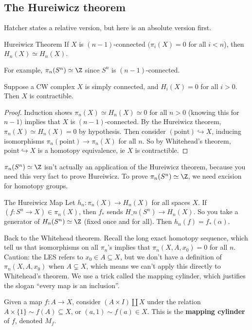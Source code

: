 \subsection{The Hureiwicz theorem}
Hatcher states a relative version, but here is an absolute version first.
\begin{namedthm}{Hureiwicz Theorem}
    If $X$ is $(n-1)$-connected $(\pi_i  (X)=0$ for all $i<n$), then $H_n (X) \simeq H_n (X)$. 
\end{namedthm}
For example, $\pi_n (S^n )\simeq\Z$ since $S^n $ is $(n-1)$-connected.
\begin{cor}
    Suppose a CW complex $X$ is simply connected, and $H_i (X)=0$ for all $i>0$. Then $X$ is contractible.
\end{cor}
\begin{proof}
    Induction shows $\pi_n (X)\simeq H_n (X) \simeq 0$ for all $n>0$ (knowing this for $n-1)$ implies that $X$ is $(n-1)$-connected. By the Hureiwicz theorem, $\pi_n (X)\simeq H_n (X)=0$ by hypothesis. Then consider $(\text{point}  )\hookrightarrow X$, inducing isomorphisms $\pi_n (\text{point} )\to \pi_n (X) $ for all $n$. So by Whitehead's theorem, $\text{point} \hookrightarrow X$ is a homotopy equivalence, ie $X$ is contractible.
\end{proof}
\begin{note}
    $\pi_n (S^n )\simeq\Z$ isn't actually an application of the Hureiwicz theorem, because you need this very fact to prove Hureiwicz. To prove  $\pi_n (S^n )\simeq\Z$, we need excision for homotopy groups.
\end{note}
\begin{namedthing}{The Hureiwicz Map}
    Let $h_n  \colon \pi_n (X) \to H_n (X)$ for all spaces $X$. If $\left( f \colon S^n  \to X \right) \in  \pi_n (X)$, then $f_*$ sends $H\_n (S^n )\to H_n (X)$. So you take a generator of $H_n (S^n )\simeq \Z$ (fixed once and for all). Then $h_n (f)=f_*(\alpha )$. 
\end{namedthing}
\orbreak
Back to the Whitehead theorem. Recall the long exact homotopy sequence, which tell us that isomorphisms on all $\pi_n $'s implies that $\pi_n (X,A,x_0)=0$ for all $n$. Caution: the LES refers to $x_0\in A\subseteq X$, but we don't have a definition of $\pi_n (X,A,x_0)$ when $A\subsetneq X $, which means we can't apply this directly to Whitehead's theorem. We use a trick called the mapping cylinder, which justifies the slogan ``every map is an inclusion''.  
\begin{definition}
    Given a map $f\colon A \to X$, consider $(A\times I)\amalg X$ under the relation $A\times \{1\} \sim f(A)\subseteq X$, or $(a,1)\sim f(a)\in X$. This is the \textbf{mapping cylinder} of $f$, denoted $M_f$.
\end{definition}
